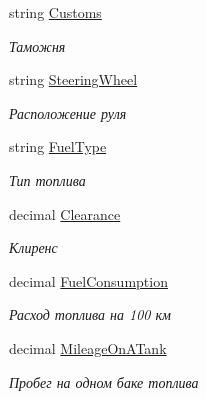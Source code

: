 \begin{DoxyCompactItemize}
string \hyperlink{class_r_t_1_1_parsing_libs_1_1_models_1_1_automoto_additional_info_a411f84694ea4cbf79e41df959cbb25e0}{Customs}
\begin{DoxyCompactList}\small\item\em Таможня \end{DoxyCompactList}\item 
string \hyperlink{class_r_t_1_1_parsing_libs_1_1_models_1_1_automoto_additional_info_ac3d5143794b3c5844c065006915cd80a}{Steering\+Wheel}
\begin{DoxyCompactList}\small\item\em Расположение руля \end{DoxyCompactList}\item 
string \hyperlink{class_r_t_1_1_parsing_libs_1_1_models_1_1_automoto_additional_info_a349f2ccbf279811d36133832c10fa09a}{Fuel\+Type}
\begin{DoxyCompactList}\small\item\em Тип топлива \end{DoxyCompactList}\item 
decimal \hyperlink{class_r_t_1_1_parsing_libs_1_1_models_1_1_automoto_additional_info_ac6b0b9770872106a4cacd576ce706665}{Clearance}
\begin{DoxyCompactList}\small\item\em Клиренс \end{DoxyCompactList}\item 
decimal \hyperlink{class_r_t_1_1_parsing_libs_1_1_models_1_1_automoto_additional_info_a76fbe743bbb6dc6af1105904b1d3a9aa}{Fuel\+Consumption}
\begin{DoxyCompactList}\small\item\em Расход топлива на 100 км \end{DoxyCompactList}\item 
decimal \hyperlink{class_r_t_1_1_parsing_libs_1_1_models_1_1_automoto_additional_info_a9b7e59c2cbed0295ecb51806a1fba21a}{Mileage\+On\+A\+Tank}
\begin{DoxyCompactList}\small\item\em Пробег на одном баке топлива \end{DoxyCompactList}\item 

\end{DoxyCompactItemize}
